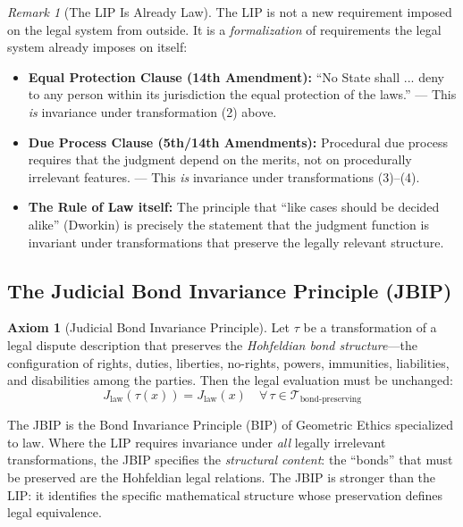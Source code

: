 \documentclass[12pt]{article}
\theoremstyle{definition}
\newtheorem{axiom}{Axiom}
\theoremstyle{remark}
\newtheorem{remark}[theorem]{Remark}
\begin{document}
\begin{remark}[The LIP Is Already Law]
The LIP is not a new requirement imposed on the legal system from outside.  It is a \emph{formalization} of requirements the legal system already imposes on itself:
\begin{itemize}
    \item \textbf{Equal Protection Clause (14th Amendment):} ``No State shall ... deny to any person within its jurisdiction the equal protection of the laws.'' --- This \emph{is} invariance under transformation (2) above.
    \item \textbf{Due Process Clause (5th/14th Amendments):} Procedural due process requires that the judgment depend on the merits, not on procedurally irrelevant features. --- This \emph{is} invariance under transformations (3)--(4).
    \item \textbf{The Rule of Law itself:} The principle that ``like cases should be decided alike'' (Dworkin) is precisely the statement that the judgment function is invariant under transformations that preserve the legally relevant structure.
\end{itemize}
\end{remark}

\subsection{The Judicial Bond Invariance Principle (JBIP)}

\begin{axiom}[Judicial Bond Invariance Principle]
\label{axiom:jbip}
Let $\tau$ be a transformation of a legal dispute description that preserves the \emph{Hohfeldian bond structure}---the configuration of rights, duties, liberties, no-rights, powers, immunities, liabilities, and disabilities among the parties.  Then the legal evaluation must be unchanged:
\begin{equation}
J_{\text{law}}(\tau(x)) = J_{\text{law}}(x) \quad \forall\, \tau \in \mathcal{T}_{\text{bond-preserving}}
\label{eq:jbip}
\end{equation}
\end{axiom}

The JBIP is the Bond Invariance Principle (BIP) of Geometric Ethics \cite{anon2026a} specialized to law.  Where the LIP requires invariance under \emph{all} legally irrelevant transformations, the JBIP specifies the \emph{structural content}: the ``bonds'' that must be preserved are the Hohfeldian legal relations.  The JBIP is stronger than the LIP: it identifies the specific mathematical structure whose preservation defines legal equivalence.
\end{document}
